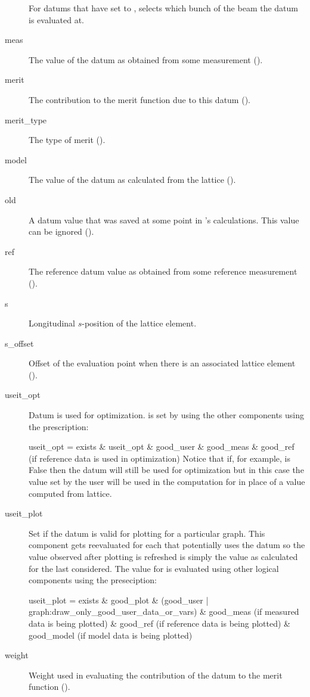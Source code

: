 \begin{description}
For datums that have  set to ,  selects which bunch
of the beam the datum is evaluated at.
  \item[meas] \Newline
The value of the datum as obtained from some measurement ().
  \item[merit] \Newline
The contribution to the merit function due to this datum ().
  \item[merit_type] \Newline
The type of merit (). 
  \item[model] \Newline
The value of the datum as calculated from the  lattice ().
  \item[old] \Newline
A datum value that was saved at some point in \tao's calculations. This value
can be ignored ().
  \item[ref] \Newline
The reference datum value as obtained from some reference measurement ().
  \item[s] \Newline
Longitudinal $s$-position of the lattice element.
  \item[s_offset] \Newline
Offset of the evaluation point when there is an associated lattice element ().
  \item[useit_opt] \Newline
Datum is used for optimization.  is set by \tao using the other
 components using the prescription:
\begin{example}
  useit_opt = exists \& useit_opt \& good_user \& good_meas \& 
              good_ref (if reference data is used in optimization)
Notice that if, for example,  is False then the datum will still be used for optimization but
in this case the  value set by the user will be used in the computation for  in
place of a value computed from lattice.
\end{example}
%
  \item[useit_plot] \Newline
Set  if the datum is valid for plotting for a particular graph. This component gets
reevaluated for each  that potentially uses the datum so the value observed after plotting is
refreshed is simply the value as calculated for the last  considered. The value for 
is evaluated using other logical components using the preseciption:
\begin{example}
  useit_plot = exists \& good_plot \& 
                  (good_user | graph:draw_only_good_user_data_or_vars) \&
                  good_meas (if measured data is being plotted) \& 
                  good_ref (if reference data is being plotted) \&
                  good_model (if model data is being plotted)
\end{example}
  \item[weight] \Newline
Weight used in evaluating the contribution of the datum to the merit function ().
\end{description}

